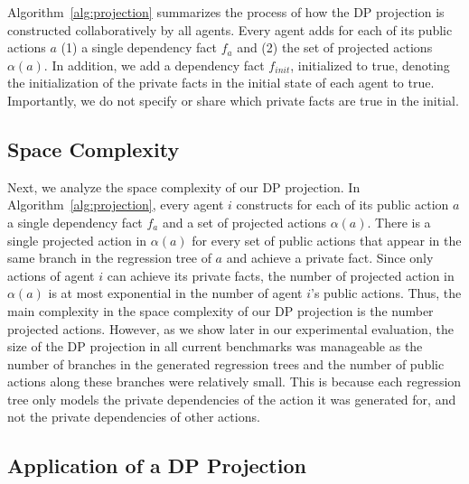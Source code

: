 \documentclass[letterpaper]{article}
\theoremstyle{definition}
\begin{document}
Algorithm~\ref{alg:projection} summarizes the process of how the DP projection is constructed collaboratively by all agents. %
Every agent adds for each of its public actions $a$ (1) a single dependency fact $f_a$ and (2) the set of projected actions $\alpha(a)$. In addition, we add a dependency fact $f_{init}$, initialized to true, denoting the initialization of the private facts in the initial state of each agent to true. Importantly, we do not specify or share which private facts are true in the initial.

\subsection{Space Complexity}
Next, we analyze the space complexity of our DP projection.
In Algorithm~\ref{alg:projection}, every agent $i$ constructs for each of its public action $a$ a single dependency fact $f_a$ and  a set of projected actions $\alpha(a)$. There is a single projected action in $\alpha(a)$ for every set of public actions that appear in the same branch in the regression tree of $a$ and achieve a private fact. Since only actions of agent $i$ can achieve its private facts, the number of projected action in $\alpha(a)$ is at most exponential in the number of agent $i$'s public actions.
Thus, the main complexity in the space complexity of our DP projection is the number projected actions. %
However, as we show later in our experimental evaluation, the size of the DP projection in all current benchmarks was manageable as the number of branches in the generated regression trees and the number of public actions along these branches were relatively small. This is because each regression tree only models the private dependencies of the action it was generated for, and not  the private dependencies of other actions.











\subsection{Application of a DP Projection}
\end{document}
